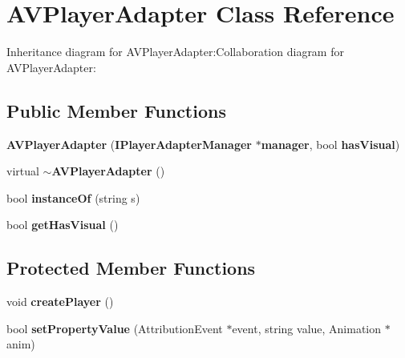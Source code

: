 \section{AVPlayerAdapter Class Reference}
\label{classbr_1_1pucrio_1_1telemidia_1_1ginga_1_1ncl_1_1adapters_1_1av_1_1AVPlayerAdapter}
Inheritance diagram for AVPlayerAdapter:Collaboration diagram for AVPlayerAdapter:\subsection*{Public Member Functions}
\begin{CompactItemize}
\item 
\textbf{AVPlayerAdapter} ({\bf IPlayerAdapterManager} $\ast${\bf manager}, bool {\bf hasVisual})\label{classbr_1_1pucrio_1_1telemidia_1_1ginga_1_1ncl_1_1adapters_1_1av_1_1AVPlayerAdapter_302586648784c8d41ee832bb4e500b19}

\item 
virtual {\bf $\sim$AVPlayerAdapter} ()\label{classbr_1_1pucrio_1_1telemidia_1_1ginga_1_1ncl_1_1adapters_1_1av_1_1AVPlayerAdapter_0517c72dd1dd8380eddb0f39c6c71ea5}

\item 
bool \textbf{instanceOf} (string s)\label{classbr_1_1pucrio_1_1telemidia_1_1ginga_1_1ncl_1_1adapters_1_1av_1_1AVPlayerAdapter_4081cb1ebb5adebc1d0858ff6f69af0d}

\item 
bool \textbf{getHasVisual} ()\label{classbr_1_1pucrio_1_1telemidia_1_1ginga_1_1ncl_1_1adapters_1_1av_1_1AVPlayerAdapter_b2b4a0ff7827181527c3636619c2b55e}

\end{CompactItemize}
\subsection*{Protected Member Functions}
\begin{CompactItemize}
\item 
void \textbf{createPlayer} ()\label{classbr_1_1pucrio_1_1telemidia_1_1ginga_1_1ncl_1_1adapters_1_1av_1_1AVPlayerAdapter_2fbb9533e3d66799b0a433c9298ea70f}

\item 
bool \textbf{setPropertyValue} (AttributionEvent $\ast$event, string value, Animation $\ast$anim)\label{classbr_1_1pucrio_1_1telemidia_1_1ginga_1_1ncl_1_1adapters_1_1av_1_1AVPlayerAdapter_3e4b84e57de627326fc7bf7c4e129ba5}

\end{CompactItemize}
